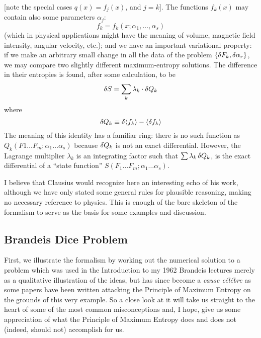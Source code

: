 [note the special cases $q(x) = f_j(x)$, and $j=k$].
The functions $f_k(x)$ may contain also some parameters $\alpha_j$:
\begin{equation*}
	f_k = f_k(x; \alpha_1, \ldots, \alpha_s)
\end{equation*}
(which in physical applications might have the meaning of volume, magnetic field intensity, angular velocity, etc.);
and we have an important variational property: if we make an arbitrary small change in all the data of the problem $\{\mathop{}\!\delta F_k, \mathop{}\!\delta \alpha_r\}$, we may compare two slightly different maximum-entropy solutions.
The difference in their entropies is found, after some calculation, to be
\begin{equation}
	\label{B8}
	\mathop{}\!\delta S = \sum_{k} \lambda_k \cdot \mathop{}\!\delta Q_k
\end{equation}
where
\begin{equation}
	\label{B9}
	\mathop{}\!\delta Q_k \equiv \mathop{}\!\delta \langle f_k\rangle - \langle\mathop{}\!\delta f_k\rangle
\end{equation}
The meaning of this identity has a familiar ring: there is no such function as $Q_k(F1 \ldots F_m; \alpha_1 \ldots \alpha_s)$ because $\mathop{}\!\delta Q_k$ is not an exact differential.
However, the Lagrange multiplier $\lambda_k$ is an integrating factor such that $\sum \lambda_k \mathop{}\!\delta Q_k$, is the exact differential of a ``state function'' $S(F_1 \ldots F_m; \alpha_1 \ldots \alpha_s)$.

I believe that Clausius would recognize here an interesting echo of his work, although we have only stated some general rules for plausible reasoning, making no necessary reference to physics.
This is enough of the bare skeleton of the formalism to serve as the basis for some examples and discussion.

\subsection{Brandeis Dice Problem}
First, we illustrate the formalism by working out the numerical solution to a problem which was used in the Introduction to my 1962 Brandeis lectures merely as a qualitative illustration of the ideas, but has since become a \emph{cause célébre} as some papers have been written attacking the Principle of Maximum Entropy on the grounds of this very example.
So a close look at it will take us straight to the heart of some of the most common misconceptions and, I hope, give us some appreciation of what the Principle of Maximum Entropy does and does not (indeed, should not) accomplish for us.

